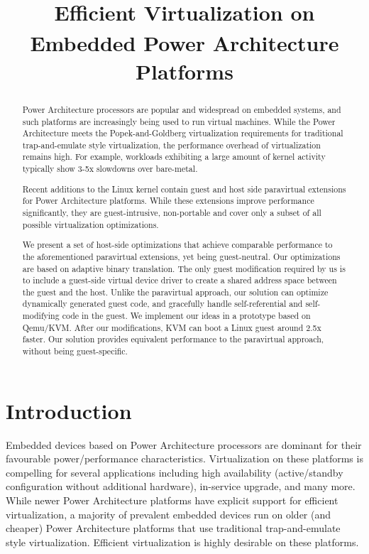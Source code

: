 \documentclass[10pt,twocolumn]{article}
\begin{document}
\title{Efficient Virtualization on Embedded Power Architecture\textsuperscript{\textregistered} Platforms}
\author{}
\date{}
\maketitle
\thispagestyle{empty}

\maketitle
\begin{abstract}
  Power Architecture\textsuperscript{\textregistered} processors are popular and widespread on embedded systems, and such
  platforms are
  increasingly
  being used to run virtual machines\cite{embedded_virtualization, KVM_on_embedded_Power}. While the Power
  Architecture meets the
  Popek-and-Goldberg virtualization requirements for traditional trap-and-emulate
  style virtualization, the performance overhead of virtualization remains high.
  For example, workloads exhibiting a large amount of kernel activity typically
  show 3-5x slowdowns over bare-metal.

  Recent additions to the Linux kernel contain guest and host side paravirtual
  extensions for Power Architecture platforms. While these extensions improve performance
  significantly, they
  are guest-intrusive, non-portable and cover only a subset of all possible
  virtualization optimizations.

  We present a set of host-side optimizations that achieve comparable
  performance
  to the aforementioned paravirtual extensions, yet being
  guest-neutral. Our optimizations are based on adaptive binary translation.
  The only
  guest modification required by us is to include a guest-side virtual device driver
  to create a shared address space between the guest and the host.
  Unlike the paravirtual approach,
  our solution can optimize dynamically generated guest code, and gracefully
  handle self-referential and self-modifying code in the guest.
  We implement our ideas in a prototype based on Qemu/KVM.
  After our modifications, KVM can boot a Linux guest around 2.5x faster. Our solution
  provides equivalent performance to
  the paravirtual approach, without being guest-specific.
\end{abstract}
\section{Introduction}
Embedded devices based on Power Architecture processors are dominant for their
favourable power/performance characteristics. Virtualization on these platforms is
compelling for several applications including high availability (active/standby
configuration without additional hardware), in-service upgrade, and many
more\cite{embedded_virtualization, KVM_on_embedded_Power}. While newer Power
Architecture platforms
have explicit support for efficient virtualization\cite{freescale_embedded_hyperv, hwassists_hyperv}, a majority of
prevalent embedded devices run on older (and cheaper) Power Architecture platforms that use
traditional trap-and-emulate style virtualization\cite{popekgoldberg}. Efficient
virtualization is highly desirable on these platforms.
\end{document}
